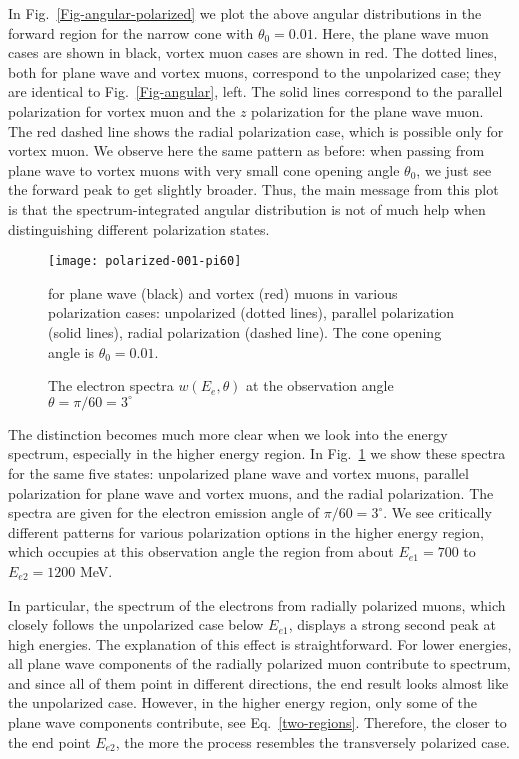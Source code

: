 \documentclass[aps,prd,longbibliography,nofootinbib,amsthm,amsmath,amssymb,amsfonts,notitlepage]{revtex4-1}
\begin{document}
In Fig.~\ref{Fig-angular-polarized} we plot the above angular distributions in the forward region for the narrow cone with $\theta_0 = 0.01$.
Here, the plane wave muon cases are shown in black, vortex muon cases are shown in red.
The dotted lines, both for plane wave and vortex muons, correspond to the unpolarized case;
they are identical to Fig.~\ref{Fig-angular}, left.
The solid lines correspond to the parallel polarization for vortex muon and the $z$ polarization for the plane wave muon.
The red dashed line shows the radial polarization case, which is possible only for vortex muon.
We observe here the same pattern as before: when passing from plane wave to vortex muons with very small cone opening angle $\theta_0$,
we just see the forward peak to get slightly broader.
Thus, the main message from this plot is that the spectrum-integrated angular distribution is not of much help when distinguishing different polarization states.

\begin{figure}[!h]
	\centering
	\texttt{[image: polarized-001-pi60]}
	\caption{The electron spectra $w(E_e, \theta)$ at the observation angle $\theta = \pi/60 = 3^\circ$ }
		for plane wave (black) and vortex (red) muons in various polarization cases:
		unpolarized (dotted lines), parallel polarization (solid lines), radial polarization (dashed line).
		The cone opening angle is $\theta_0 = 0.01$.\label{Fig-spectra-polarized}
\end{figure}

The distinction becomes much more clear when we look into the energy spectrum, especially in the higher energy region.
In Fig.~\ref{Fig-spectra-polarized} we show these spectra for the same five states:
unpolarized plane wave and vortex muons, parallel polarization for plane wave and vortex muons,
and the radial polarization. The spectra are given for the electron emission angle of $\pi/60 = 3^\circ$.
We see critically different patterns for various polarization options in the higher energy region,
which occupies at this observation angle the region from about $E_{e1}=700$ to $E_{e2}=1200$ MeV.

In particular, the spectrum of the electrons from radially polarized muons, which closely follows the unpolarized case below $E_{e1}$,
displays a strong second peak at high energies. The explanation of this effect is straightforward.
For lower energies, all plane wave components of the radially polarized muon contribute to spectrum,
and since all of them point in different directions, the end result looks almost like the unpolarized case.
However, in the higher energy region, only some of the plane wave components contribute, see Eq.~\eqref{two-regions}.
Therefore, the closer to the end point $E_{e2}$, the more the process resembles the transversely polarized case.
\end{document}
